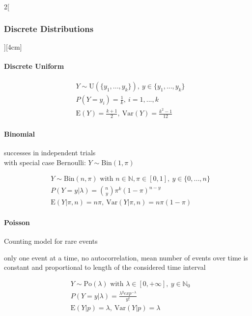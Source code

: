 \documentclass[8pt]{extarticle}
\begin{document}
\begin{multicols}{2}[\subsubsection{Discrete Distributions}][4cm]

  \paragraph{Discrete Uniform}
  
    \begin{align*}
    & Y \sim \mathrm{U}(\{y_1, ..., y_k\}),\: y \in \{y_1, ..., y_k\} \\
    & P(Y=y_i) =\frac{1}{k},\: i = 1, ...,k \\
    & \mathrm{E}(Y) = \frac{k+1}{2} ,\: \mathrm{Var}(Y) = \frac{k^2 - 1}{12}
  \end{align*}
  
  
    \paragraph{Binomial}
  successes in independent trials \\ \noindent with special case Bernoulli: $Y \sim \mathrm{Bin}(1, \pi)$

  \begin{align*}
    & Y \sim \mathrm{Bin}(n, \pi) \text{ with } n \in \mathbb{N}, \pi \in \left[0,1\right] ,\: y \in \{0, ..., n\} \\
    & P(Y=y|\lambda) = \binom{n}{y}\pi^k(1-\pi)^{n-y} \\
    & \mathrm{E}(Y|\pi,n) = n\pi ,\: \mathrm{Var}(Y|\pi,n) = n\pi(1-\pi)
  \end{align*}

  \paragraph{Poisson}
  Counting model for rare events

\noindent only one event at a time, no autocorrelation, mean number of events over time is constant and proportional to length of the considered time interval 

  \begin{align*}
    & Y \sim \mathrm{Po}(\lambda) \text{ with } \lambda \in \left[ 0, + \infty \right] ,\: y \in \mathbb{N}_0 \\
    & P(Y=y|\lambda) =\frac{\lambda^y exp^{-\lambda}}{y!} \\
    & \mathrm{E}(Y|p) = \lambda ,\: \mathrm{Var}(Y|p) = \lambda
  \end{align*}


\end{multicols}
\end{document}
